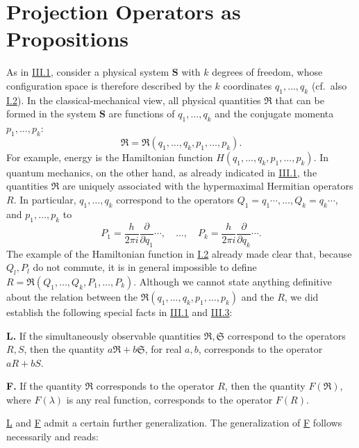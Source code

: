 \documentclass[fontsize=13pt,twoside,openany,headings=normal,parskip=false,bookmarkpackage=false,DIV=calc]{scrbook}
\begin{document}
\section{Projection Operators as Propositions}\label{sec:III.5}
As in \hyperref[sec:III.1]{III.1}, consider a physical system $\boldsymbol{S}$ with $k$ degrees of freedom, whose configuration space is therefore described by the $k$ coordinates $q_1,\ldots,q_k$ (cf.\ also \hyperref[sec:I.2]{I.2}). In the classical-mechanical view, all physical quantities $\mathfrak R$ that can be formed in the system $\boldsymbol{S}$ are functions of $q_1,\ldots,q_k$ and the conjugate momenta $p_1,\ldots,p_k$:
\[
\mathfrak R=\mathfrak R(q_1,\ldots,q_k,p_1,\ldots,p_k).
\]
For example, energy is the Hamiltonian function $H(q_1,\ldots,q_k,p_1,\ldots,p_k)$. In quantum mechanics, on the other hand, as already indicated in \hyperref[sec:III.1]{III.1}, the quantities $\mathfrak R$ are uniquely associated with the hypermaximal Hermitian operators $R$. In particular, $q_1,\ldots,q_k$ correspond to the operators $Q_1=q_1\cdots,\ldots,Q_k=q_k\cdots$, and $p_1,\ldots,p_k$ to
\[
P_1=\frac h{2\pi i}\frac\partial{\partial q_1}\cdots,\quad\ldots,\quad
P_k=\frac h{2\pi i}\frac\partial{\partial q_k}\cdots.
\]
The example of the Hamiltonian function in \hyperref[sec:I.2]{I.2} already made clear that, because $Q_l,P_l$ do not commute, it is in general impossible to define $R=\mathfrak R(Q_1,\ldots,Q_k,P_1,\ldots,P_k)$. Although we cannot state anything definitive about the relation between the $\mathfrak R(q_1,\ldots,q_k,p_1,\ldots,p_k)$ and the $R$, we did establish the following special facts in \hyperref[sec:III.1]{III.1} and \hyperref[sec:III.3]{III.3}:

\leavevmode{}\label{post:III.5.L}\textbf{L.} If the simultaneously observable quantities $\mathfrak R,\mathfrak S$ correspond to the operators $R,S$, then the quantity $a\mathfrak R+b\mathfrak S$, for real $a,b$, corresponds to the operator $aR+bS$.

\hypertarget{origpage-131}{}%
\leavevmode{}\label{post:III.5.F}\textbf{F.} If the quantity $\mathfrak R$ corresponds to the operator $R$, then the quantity $F(\mathfrak R)$, where $F(\lambda)$ is any real function, corresponds to the operator $F(R)$.

\hyperref[post:III.5.L]{L} and \hyperref[post:III.5.F]{F} admit a certain further generalization. The generalization of \hyperref[post:III.5.F]{F} follows necessarily and reads:
\end{document}

